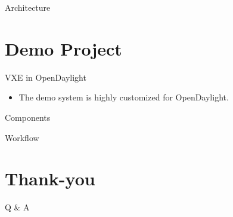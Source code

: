 \documentclass[aspectratio=169, notes]{beamer}
\begin{document}
\begin{frame}{Architecture}
\end{frame}

\section{Demo Project}

\begin{frame}{VXE in OpenDaylight}

	\begin{itemize}
		\item The demo system is highly customized for OpenDaylight.
	\end{itemize}

\end{frame}

\begin{frame}{Components}
\end{frame}

\begin{frame}{Workflow}
\end{frame}

\section{Thank-you}

\begin{frame}
	\begin{center}
		\Large{Q \& A}
	\end{center}
\end{frame}
\end{document}
